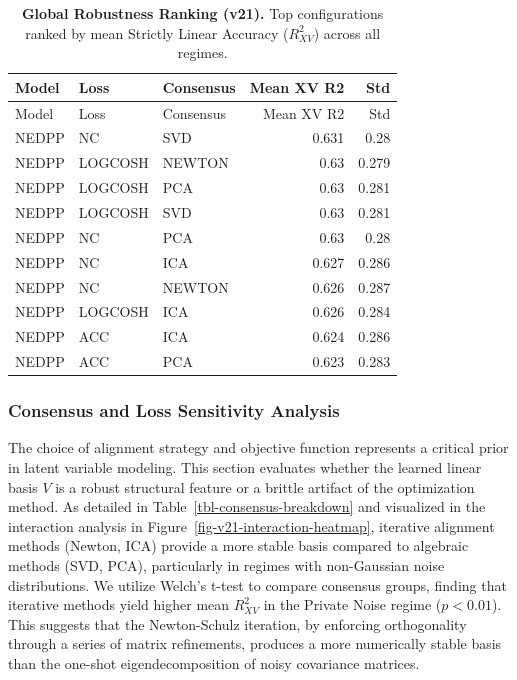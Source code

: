 \documentclass[
  letterpaper,
]{report}
\begin{document}
\begin{longtable}[]{@{}lllrr@{}}
\caption{\textbf{Global Robustness Ranking (v21).} Top configurations
ranked by mean Strictly Linear Accuracy (\(R^2_{XV}\)) across all
regimes.}\label{tbl-global-robustness}\tabularnewline
\toprule\noalign{}
Model & Loss & Consensus & Mean XV R2 & Std \\
\midrule\noalign{}
\endfirsthead
\toprule\noalign{}
Model & Loss & Consensus & Mean XV R2 & Std \\
\midrule\noalign{}
\endhead
\bottomrule\noalign{}
\endlastfoot
NEDPP & NC & SVD & 0.631 & 0.28 \\
NEDPP & LOGCOSH & NEWTON & 0.63 & 0.279 \\
NEDPP & LOGCOSH & PCA & 0.63 & 0.281 \\
NEDPP & LOGCOSH & SVD & 0.63 & 0.281 \\
NEDPP & NC & PCA & 0.63 & 0.28 \\
NEDPP & NC & ICA & 0.627 & 0.286 \\
NEDPP & NC & NEWTON & 0.626 & 0.287 \\
NEDPP & LOGCOSH & ICA & 0.626 & 0.284 \\
NEDPP & ACC & ICA & 0.624 & 0.286 \\
NEDPP & ACC & PCA & 0.623 & 0.283 \\
\end{longtable}

\subsubsection{Consensus and Loss Sensitivity
Analysis}\label{consensus-and-loss-sensitivity-analysis}

The choice of alignment strategy and objective function represents a
critical prior in latent variable modeling. This section evaluates
whether the learned linear basis \(V\) is a robust structural feature or
a brittle artifact of the optimization method. As detailed in
Table~\ref{tbl-consensus-breakdown} and visualized in the interaction
analysis in Figure~\ref{fig-v21-interaction-heatmap}, iterative
alignment methods (Newton, ICA) provide a more stable basis compared to
algebraic methods (SVD, PCA), particularly in regimes with non-Gaussian
noise distributions. We utilize Welch's t-test to compare consensus
groups, finding that iterative methods yield higher mean \(R^2_{XV}\) in
the Private Noise regime (\(p < 0.01\)). This suggests that the
Newton-Schulz iteration, by enforcing orthogonality through a series of
matrix refinements, produces a more numerically stable basis than the
one-shot eigendecomposition of noisy covariance matrices.
\end{document}
